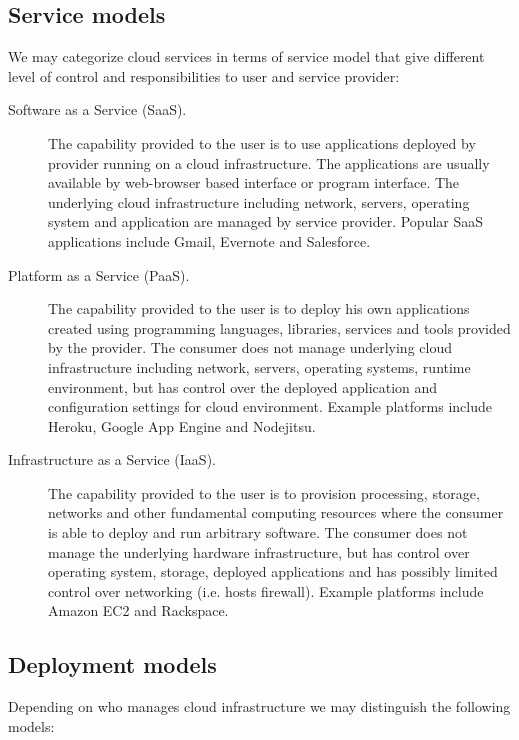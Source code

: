 \subsection{Service models}

We may categorize cloud services in terms of service model that give different level of control and responsibilities to user and service provider:

\begin{description}
  \item[Software as a Service (SaaS).] The capability provided to the user is to use applications deployed by provider running on a cloud infrastructure. The applications are usually available by web-browser based interface or program interface. The underlying cloud infrastructure including network, servers, operating system and application are managed by service provider. Popular SaaS applications include Gmail, Evernote and Salesforce.
  \item[Platform as a Service (PaaS).] The capability provided to the user is to deploy his own applications created using programming languages, libraries, services and tools provided by the provider. The consumer does not manage underlying cloud infrastructure including network, servers, operating systems, runtime environment, but has control over the deployed application and configuration settings for cloud environment. Example platforms include Heroku, Google App Engine and Nodejitsu.
  \item[Infrastructure as a Service (IaaS).] The capability provided to the user is to provision processing, storage, networks and other fundamental computing resources where the consumer is able to deploy and run arbitrary software. The consumer does not manage the underlying hardware infrastructure, but has control over operating system, storage, deployed applications and has possibly limited control over networking (i.e. hosts firewall). Example platforms include Amazon EC2 and Rackspace.
\end{description}

\subsection{Deployment models}

Depending on who manages cloud infrastructure we may distinguish the following models:


